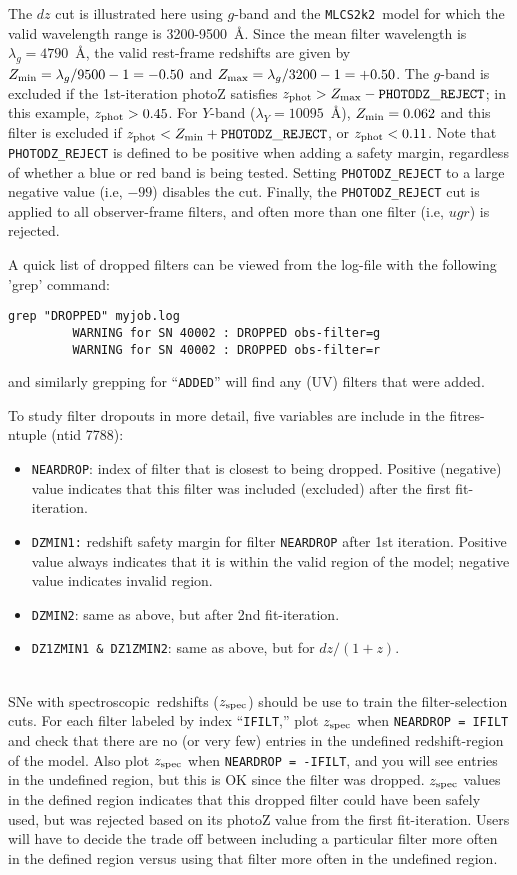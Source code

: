 \documentclass[12pt]{article}
\newcommand{\mlcs}{{\tt MLCS2k2}}
\newcommand{\Zphot}{z_{\rm phot}}
\newcommand{\Zspec}{z_{\rm spec}}
\newcommand{\spec}{spectroscopic}
\newcommand{\lamg}{\lambda_g}
\newcommand{\lamY}{\lambda_Y}
\newcommand{\zmin}{Z_{\rm min}}
\newcommand{\zmax}{Z_{\rm max}}
\begin{document}
The $dz$ cut is illustrated here using $g$-band and the \mlcs\
model for which the valid wavelength range is 3200-9500~\AA.
Since the mean filter wavelength is $\lamg = 4790$~\AA,
the valid rest-frame redshifts are given by
$\zmin = \lamg/9500 -1 = -0.50$ and
$\zmax = \lamg/3200 -1 = +0.50$.
The $g$-band is excluded if the 1st-iteration  photoZ satisfies
$\Zphot > \zmax - {\tt PHOTODZ\_REJECT}$;
in this example, $\Zphot > 0.45$.
For $Y$-band ($\lamY = 10095$~\AA), $\zmin = 0.062$
and this filter is excluded if $\Zphot < \zmin + {\tt PHOTODZ\_REJECT}$,
or $\Zphot < 0.11$.
Note that {\tt PHOTODZ\_REJECT} is defined to be positive when adding a 
safety margin, regardless of whether a blue or red band is being tested.
Setting  {\tt PHOTODZ\_REJECT} to a large negative value (i.e, $-99$)
disables the cut.
Finally, the {\tt PHOTODZ\_REJECT} cut is applied to all observer-frame
filters, and often more than one filter (i.e, $ugr$) is rejected.


A quick list of dropped filters can be viewed from the log-file
with the following 'grep' command:
\begin{Verbatim}[frame=single]
   grep "DROPPED" myjob.log
         WARNING for SN 40002 : DROPPED obs-filter=g
         WARNING for SN 40002 : DROPPED obs-filter=r
\end{Verbatim}
%
and similarly grepping for ``{\tt ADDED}'' will find any 
(UV) filters that were added.

To study filter dropouts in more detail, 
five variables are include in the fitres-ntuple (ntid 7788):
\begin{itemize}
  \item {\tt NEARDROP}: index of filter that is closest
        to being dropped. Positive (negative) value indicates
        that this filter was included (excluded) after the 
        first fit-iteration.
%
  \item {\tt DZMIN1:} redshift safety margin for filter {\tt NEARDROP}
        after 1st iteration.
        Positive value always indicates that it is within the
	valid region of the model; negative value indicates
	invalid region.
%
 \item  {\tt DZMIN2}: same as above, but after 2nd fit-iteration.
%
  \item {\tt DZ1ZMIN1 \& DZ1ZMIN2}: same as above, but for $dz/(1+z)$.
\end{itemize}

\bigskip
{} \\
SNe with \spec\ redshifts ($\Zspec$) should be use to train 
the filter-selection cuts.
For each filter labeled by index ``{\tt IFILT},''
plot $\Zspec$ when {\tt NEARDROP = IFILT} and check
that there are no (or very few) entries in the undefined
redshift-region of the model.  
Also plot $\Zspec$ when {\tt NEARDROP = -IFILT},
and you will see entries in the undefined region,
but this is OK since the filter was dropped.
$\Zspec$ values in the defined region indicates that
this dropped filter could have been safely used,
but was rejected based on its photoZ value from the
first fit-iteration. Users will have to decide the
trade off between including a particular filter more 
often in the defined region versus using that filter
more often in the undefined region.
\end{document}
